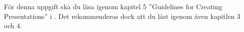 För denna uppgift ska du läsa igenom kapitel 5 ''Guidelines for Creating 
Presentations'' i  \cite{beameruserguide}.
Det rekommenderas dock att du läst igenom även kapitlen 3 och 4.
